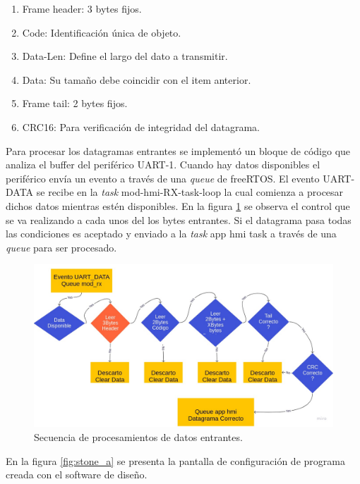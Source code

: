 \begin{enumerate}

\item Frame header: 3 bytes fijos.
\item Code: Identificación única de objeto.
\item Data-Len: Define el largo del dato a transmitir.
\item Data: Su tamaño debe coincidir con el item anterior.
\item Frame tail: 2 bytes fijos.
\item CRC16: Para verificación de integridad del datagrama.

\end{enumerate}

Para procesar los datagramas entrantes se implementó un bloque de código que analiza el buffer del periférico UART-1. Cuando hay datos disponibles el periférico envía un evento a través de una \textit{queue} de freeRTOS. El evento UART-DATA se recibe en la \textit{task} mod-hmi-RX-task-loop la cual comienza a procesar dichos datos mientras estén disponibles. En la figura \ref{fig:secuencia_a} se observa el control que se va realizando a cada unos del los bytes entrantes. Si el datagrama pasa todas las condiciones es aceptado y enviado a la \textit{task} app hmi task a través de una \textit{queue} para ser procesado.


\begin{figure}[h!]
	\centering
	\includegraphics[width=\textwidth]{./Figures/Secuencia_lectura_uart.jpg}
	\caption{Secuencia de procesamientos de datos entrantes.}
	\label{fig:secuencia_a}
\end{figure}

 
En la figura \ref{fig:stone_a} se presenta la pantalla de configuración de programa  creada con el software de diseño.

